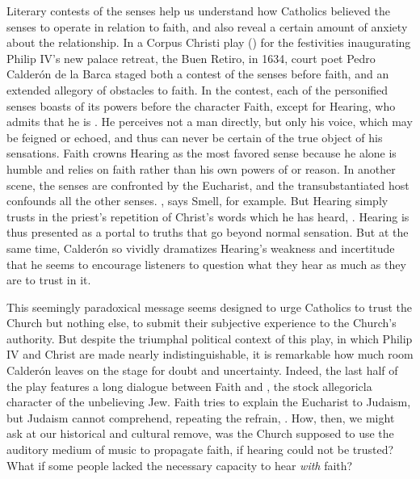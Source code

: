 Literary contests of the senses help us understand how Catholics believed the senses to operate in relation to faith, and also reveal a certain amount of anxiety about the relationship.
In a Corpus Christi play () for the festivities inaugurating Philip IV's new palace retreat, the Buen Retiro, in 1634, court poet Pedro Calderón de la Barca staged both a contest of the senses before faith, and an extended allegory of obstacles to faith.
In the contest, each of the personified senses boasts of its powers before the character Faith, except for Hearing, who admits that he is .
He perceives not a man directly, but only his voice, which may be feigned or echoed, and thus can never be certain of the true object of his sensations.
Faith crowns Hearing as the most favored sense because he alone is humble and relies on faith rather than his own powers of  or reason.
In another scene, the senses are confronted by the Eucharist, and the transubstantiated host confounds all the other senses.
, says Smell, for example.
But Hearing simply trusts in the priest's repetition of Christ's words which he has heard, .
Hearing is thus presented as a portal to truths that go beyond normal sensation.
But at the same time, Calderón so vividly dramatizes Hearing's weakness and incertitude that he seems to encourage listeners to question what they hear as much as they are to trust in it.

This seemingly paradoxical message seems designed to urge Catholics to trust the Church but nothing else, to submit their subjective experience to the Church's authority.
But despite the triumphal political context of this play, in which Philip IV and Christ are made nearly indistinguishable, it is remarkable how much room Calderón leaves on the stage for doubt and uncertainty.
Indeed, the last half of the play features a long dialogue between Faith and , the stock allegoricla character of the unbelieving Jew.
Faith tries to explain the Eucharist to Judaism, but Judaism cannot comprehend, repeating the refrain, .
How, then, we might ask at our historical and cultural remove, was the Church supposed to use the auditory medium of music to propagate faith, if hearing could not be trusted? 
What if some people lacked the necessary capacity to hear  \emph{with} faith?

